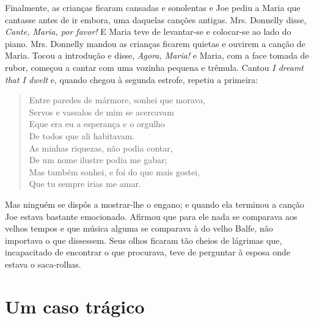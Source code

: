 Finalmente, as crianças ficaram cansadas e sonolentas e Joe pediu a
Maria que cantasse antes de ir embora, uma daquelas canções antigas.
Mrs. Donnelly disse, \textit{Cante, Maria, por favor!} E Maria teve de
levantar-se e colocar-se ao lado do piano. Mrs. Donnelly mandou as
crianças ficarem quietas e ouvirem a canção de Maria. Tocou a
introdução e disse, \textit{Agora, Maria!} e Maria, com a face tomada de rubor,
começou a cantar com uma vozinha pequena e trêmula. Cantou \textit{I
dreamt that I dwelt} e, quando chegou à segunda estrofe, repetiu a primeira:

\begin{verse}
Entre paredes de mármore, sonhei que morava,\\
Servos e vassalos de mim se acercavam\\
Eque era eu a esperança e o orgulho\\
De todos que ali habitavam.\\
As minhas riquezas, não podia contar,\\
De um nome ilustre podia me gabar;\\
Mas também sonhei, e foi do que mais gostei,\\
Que tu sempre irias me amar.
\end{verse}

Mas ninguém se dispôs a mostrar-lhe o engano; e quando ela terminou a
canção Joe estava bastante emocionado. Afirmou que para ele nada se
comparava aos velhos tempos e que música alguma se comparava à do
velho Balfe, não importava o que dissessem. Seus olhos ficaram tão
cheios de lágrimas que, incapacitado de encontrar o que procurava,
teve de perguntar à esposa onde estava o saca-rolhas.

\chapter{Um caso trágico}

